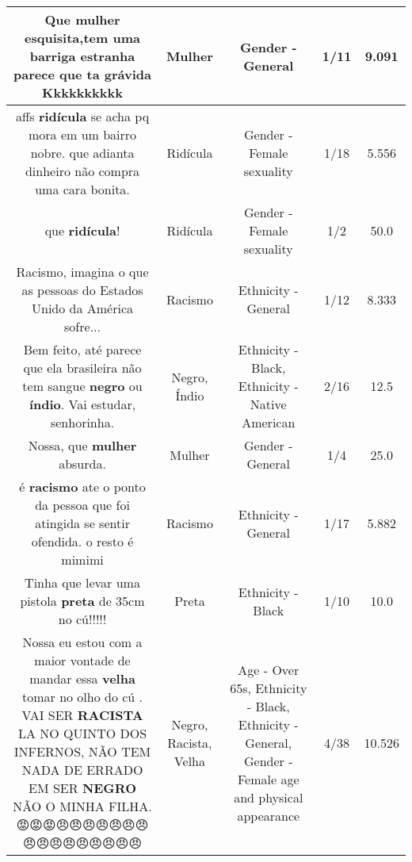 \documentclass[11pt]{article}
\newlength\mylength
\begin{document}
\begin{center}
\begin{longtable}{|C{.65\mylength}|C{.30\mylength}|C{.12\mylength}|C{.12\mylength}|C{.12\mylength}|}
  \small Que \textbf{mulher} esquisita,tem uma barriga estranha parece que ta grávida Kkkkkkkkkk\normalsize   & Mulher & Gender - General & 1/11 & 9.091 \\  \hline
  \small affs \textbf{ridícula} se acha pq mora em um bairro nobre. que adianta dinheiro não compra uma cara bonita.\normalsize   & Ridícula & Gender - Female sexuality & 1/18 & 5.556 \\  \hline
  \small que \textbf{ridícula}!\normalsize   & Ridícula & Gender - Female sexuality & 1/2 & 50.0 \\  \hline
  \small Racismo,  imagina o que as pessoas do Estados Unido da América sofre...\normalsize   & Racismo & Ethnicity - General & 1/12 & 8.333 \\  \hline
  \small Bem feito, até parece que ela brasileira não tem sangue \textbf{negro} ou \textbf{índio}. Vai estudar, senhorinha.\normalsize   & Negro, Índio & Ethnicity - Black, Ethnicity - Native American & 2/16 & 12.5 \\  \hline
  \small Nossa, que \textbf{mulher} absurda.\normalsize   & Mulher & Gender - General & 1/4 & 25.0 \\  \hline
  \small é \textbf{racismo} ate o ponto da pessoa que foi atingida se sentir ofendida. o resto é mimimi\normalsize   & Racismo & Ethnicity - General & 1/17 & 5.882 \\  \hline
  \small Tinha que levar uma pistola \textbf{preta} de 35cm no cú!!!!!\normalsize   & Preta & Ethnicity - Black & 1/10 & 10.0 \\  \hline
  \small Nossa eu estou com a maior vontade de mandar essa \textbf{v\textbf{elha}} tomar no olho do cú . VAI SER \textbf{RACISTA} LA NO QUINTO DOS INFERNOS,  NÃO TEM NADA DE ERRADO EM SER \textbf{NEGRO} NÃO O MINHA FILHA. 😡😡😡😠😠😠😠😠😠😠😠😠😠😠😠😠😠😠😠\normalsize   & Negro, Racista, Velha & Age - Over 65s, Ethnicity - Black, Ethnicity - General, Gender - Female age and physical appearance & 4/38 & 10.526 \\  \hline

\end{longtable}
\end{center}
\end{document}
